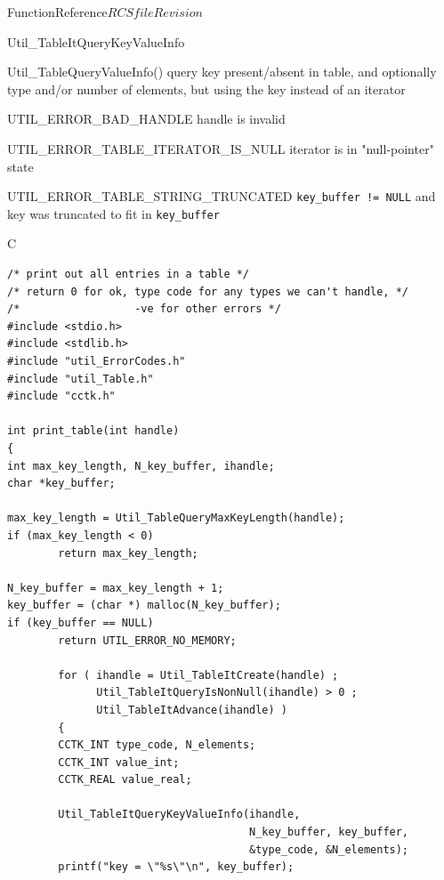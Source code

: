 \begin{cactuspart}{FunctionReference}{$RCSfile$}{$Revision$}
\begin{FunctionDescription}{Util\_TableItQueryKeyValueInfo}
\begin{SeeAlsoSection}
\begin{SeeAlso}{Util\_TableQueryValueInfo()}
query key present/absent in table, and optionally type and/or number
of elements, but using the key instead of an iterator
\end{SeeAlso}
\end{SeeAlsoSection}

\begin{ErrorSection}
\begin{Error}{UTIL\_ERROR\_BAD\_HANDLE}
handle is invalid
\end{Error}
\begin{Error}{UTIL\_ERROR\_TABLE\_ITERATOR\_IS\_NULL}
\quad
iterator is in "null-pointer" state
\end{Error}
\begin{Error}{UTIL\_ERROR\_TABLE\_STRING\_TRUNCATED}
\quad
\verb|key_buffer != NULL| and key was truncated to fit in \verb|key_buffer|
\end{Error}
\end{ErrorSection}

\begin{ExampleSection}
\begin{Example}{C}
\begin{verbatim}
/* print out all entries in a table */
/* return 0 for ok, type code for any types we can't handle, */
/*                  -ve for other errors */
#include <stdio.h>
#include <stdlib.h>
#include "util_ErrorCodes.h"
#include "util_Table.h"
#include "cctk.h"

int print_table(int handle)
{
int max_key_length, N_key_buffer, ihandle;
char *key_buffer;

max_key_length = Util_TableQueryMaxKeyLength(handle);
if (max_key_length < 0)
        return max_key_length;

N_key_buffer = max_key_length + 1;
key_buffer = (char *) malloc(N_key_buffer);
if (key_buffer == NULL)
        return UTIL_ERROR_NO_MEMORY;

        for ( ihandle = Util_TableItCreate(handle) ;
              Util_TableItQueryIsNonNull(ihandle) > 0 ;
              Util_TableItAdvance(ihandle) )
        {
        CCTK_INT type_code, N_elements;
        CCTK_INT value_int;
        CCTK_REAL value_real;

        Util_TableItQueryKeyValueInfo(ihandle,
                                      N_key_buffer, key_buffer,
                                      &type_code, &N_elements);
        printf("key = \"%s\"\n", key_buffer);


\end{verbatim}
\end{Example}
\end{ExampleSection}
\end{FunctionDescription}
\end{cactuspart}
